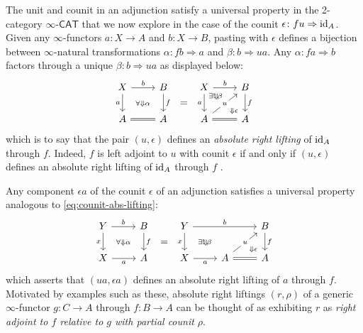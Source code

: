 \documentclass[11pt]{ctexart}
\theoremstyle{definition}
\theoremstyle{remark}
\numberwithin{equation}{section}
\newcommand{\id}{\textup{id}}
\newcommand{\To}{\Rightarrow}
\newcommand{\ooCAT}{\infty\text{-}\mathsf{CAT}}
\newcommand{\1}{\mathbbe{1}}
\newcommand{\2}{\mathbbe{2}}
\newcommand{\3}{\mathbbe{3}}
\begin{document}
The unit and counit in an adjunction satisfy a universal property in the 2-category $\ooCAT$ that we now explore in the case of the counit $\epsilon \colon fu \To \id_A$. Given any $\infty$-functors $a \colon X \to A$ and $b \colon X \to B$, pasting with $\epsilon$ defines a bijection between $\infty$-natural transformations $\alpha \colon fb \To a$ and $\beta \colon b \To ua$. Any $\alpha \colon fa \To b$ factors through a unique $\beta \colon b \To ua$ as displayed below:
\begin{equation}\label{eq:counit-abs-lifting}
    \begin{tikzcd} X \arrow[r, "b"] \arrow[d, "a"'] \arrow[dr, phantom, "\scriptstyle\forall\Downarrow\alpha"] & B \arrow[d, "f"] & X \arrow[r, "b"] \arrow[d, "a"'] \arrow[dr, phantom, "\scriptstyle\exists!\!\Downarrow\!\beta" very near start, "\scriptstyle\Downarrow\epsilon" very near end] & B \arrow[d, "f"]\\ A \arrow[r, equals] & A \arrow[ur, phantom, "="] & A \arrow[r, equals] \arrow[ur, "u" description] & A
    \end{tikzcd}
\end{equation}
which is to say that the pair $(u,\epsilon)$ defines an \emph{absolute right lifting} of $\id_A$ through $f$. Indeed, $f$ is left adjoint to $u$ with counit $\epsilon$ if and only if $(u,\epsilon)$ defines an absolute right lifting of $\id_A$ through $f$ \cite[2.3.7]{RV}.

Any component $\epsilon a$ of the counit $\epsilon$ of an adjunction satisfies a universal property analogous to \eqref{eq:counit-abs-lifting}:
\[
\begin{tikzcd} Y \arrow[r, "b"] \arrow[d, "x"'] \arrow[dr, phantom, "\scriptstyle\forall\Downarrow\alpha"] & B \arrow[d, "f"] & Y \arrow[rr, "b"] \arrow[d, "x"'] \arrow[dr, phantom, "\scriptstyle\exists!\!\Downarrow\!\beta"]  & \arrow[dr, phantom, "\scriptstyle\Downarrow\epsilon" very near end] & B \arrow[d, "f"]\\ X \arrow[r, "a"'] & A \arrow[ur, phantom, "="] & X \arrow[r, "a"'] & A \arrow[r, equals] \arrow[ur, "u" description] & A
\end{tikzcd}
\]
which asserts that $(ua,\epsilon a)$ defines an absolute right lifting of $a$ through $f$. Motivated by examples such as these, absolute right liftings $(r,\rho)$ of a generic $\infty$-functor $g \colon C \to A$ through $f \colon B \to A$ can be thought of as exhibiting $r$ as \emph{ right adjoint to $f$ relative to $g$ with partial counit $\rho$}.
\end{document}
